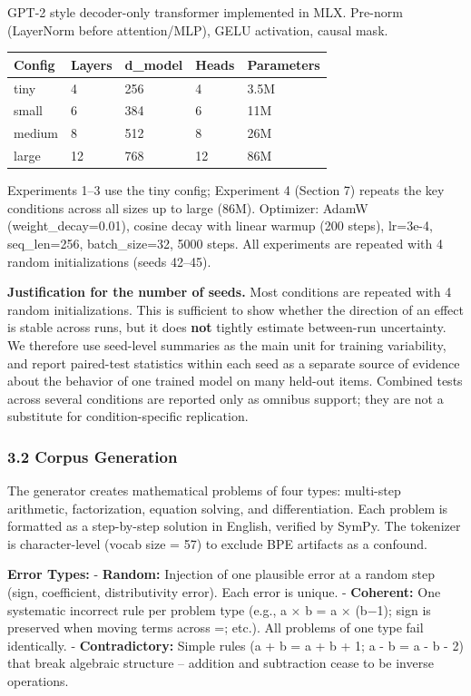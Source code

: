 \documentclass[
  11pt,
]{article}
\newcounter{none} %
\begin{document}
GPT-2 style decoder-only transformer implemented in MLX. Pre-norm
(LayerNorm before attention/MLP), GELU activation, causal mask.

{\def\LTcaptype{none} %
\begin{longtable}[]{@{}lllll@{}}
\toprule\noalign{}
Config & Layers & d\_model & Heads & Parameters \\
\midrule\noalign{}
\endhead
\bottomrule\noalign{}
\endlastfoot
tiny & 4 & 256 & 4 & 3.5M \\
small & 6 & 384 & 6 & 11M \\
medium & 8 & 512 & 8 & 26M \\
large & 12 & 768 & 12 & 86M \\
\end{longtable}
}

Experiments 1--3 use the tiny config; Experiment 4 (Section 7) repeats
the key conditions across all sizes up to large (86M). Optimizer: AdamW
(weight\_decay=0.01), cosine decay with linear warmup (200 steps),
lr=3e-4, seq\_len=256, batch\_size=32, 5000 steps. All experiments are
repeated with 4 random initializations (seeds 42--45).

\textbf{Justification for the number of seeds.} Most conditions are
repeated with 4 random initializations. This is sufficient to show
whether the direction of an effect is stable across runs, but it does
\textbf{not} tightly estimate between-run uncertainty. We therefore use
seed-level summaries as the main unit for training variability, and
report paired-test statistics within each seed as a separate source of
evidence about the behavior of one trained model on many held-out items.
Combined tests across several conditions are reported only as omnibus
support; they are not a substitute for condition-specific replication.

\subsubsection{3.2 Corpus Generation}\label{corpus-generation}

The generator creates mathematical problems of four types: multi-step
arithmetic, factorization, equation solving, and differentiation. Each
problem is formatted as a step-by-step solution in English, verified by
SymPy. The tokenizer is character-level (vocab size = 57) to exclude BPE
artifacts as a confound.

\textbf{Error Types:} - \textbf{Random:} Injection of one plausible
error at a random step (sign, coefficient, distributivity error). Each
error is unique. - \textbf{Coherent:} One systematic incorrect rule per
problem type (e.g., a \ensuremath{\times} b = a \ensuremath{\times} (b\ensuremath{-}1); sign is preserved when moving
terms across =; etc.). All problems of one type fail identically. -
\textbf{Contradictory:} Simple rules (a + b = a + b + 1; a - b = a - b -
2) that break algebraic structure -- addition and subtraction cease to
be inverse operations.
\end{document}
